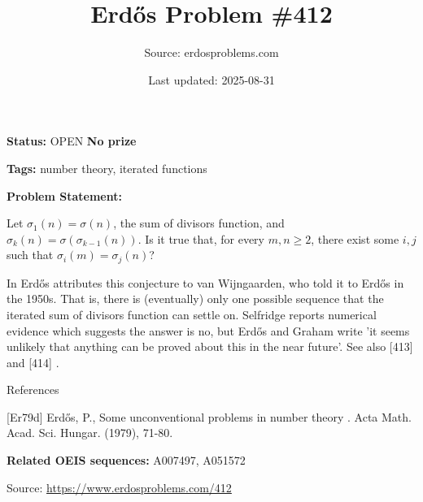 \documentclass{article}
\title{Erd\H{o}s Problem \#412}
\date{Last updated: 2025-08-31}
\author{Source: erdosproblems.com}
\begin{document}
\maketitle

\noindent\textbf{Status:} OPEN \quad \textbf{No prize}

\noindent\textbf{Tags:} number theory, iterated functions

\medskip

\noindent\textbf{Problem Statement:}

Let $\sigma_1(n)=\sigma(n)$, the sum of divisors function, and $\sigma_k(n)=\sigma(\sigma_{k-1}(n))$. Is it true that, for every $m,n\geq 2$, there exist some $i,j$ such that $\sigma_i(m)=\sigma_j(n)$?




In \cite{Er79d} Erd\H{o}s attributes this conjecture to van Wijngaarden, who told it to Erd\H{o}s in the 1950s. That is, there is (eventually) only one possible sequence that the iterated sum of divisors function can settle on. Selfridge reports numerical evidence which suggests the answer is no, but Erd\H{o}s and Graham write 'it seems unlikely that anything can be proved about this in the near future'. See also [413] and [414] .




References

[Er79d] Erd\H{o}s, P., Some unconventional problems in number theory . Acta Math. Acad. Sci. Hungar. (1979), 71-80.

\noindent\textbf{Related OEIS sequences:} A007497, A051572


\bigskip
\noindent\small{Source: \url{https://www.erdosproblems.com/412}}
\end{document}
